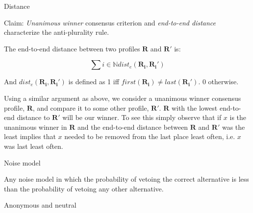 \documentclass[12pt]{article}
\newcommand{\N}{\mathbb{N}}
\newenvironment{question}[2][Question]{\begin{trivlist}
\item[\hskip \labelsep {\bfseries #1}\hskip \labelsep {\bfseries #2.}]}{\end{trivlist}}
\newenvironment{answer}[2][Answer]{\begin{trivlist}
\item[\hskip \labelsep {\bfseries #1}\hskip \labelsep {\bfseries #2:}]}{\end{trivlist}}
\begin{document}
\begin{answer}{b)}{Distance}

Claim: \textit{Unanimous winner} consensus criterion and \textit{end-to-end distance} characterize the anti-plurality rule.


The end-to-end distance between two profiles $\boldsymbol{R}$ and $\boldsymbol{R'}$ is:

$$\sum{i \in \N}{}{dist_e(\boldsymbol{R_i}, \boldsymbol{R_i'})}$$

And $dist_e(\boldsymbol{R_i}, \boldsymbol{R_i'})$ is defined as 1 iff $first(\boldsymbol{R_i}) \neq last(\boldsymbol{R_i'})$. 0 otherwise.

Using a similar argument as above, we consider a unanimous winner consensus profile, $\boldsymbol{R}$, and compare it to some other profile, $\boldsymbol{R'}$. $\boldsymbol{R}$ with the lowest end-to-end distance to $\boldsymbol{R'}$ will be our winner. To see this simply observe that if $x$ is the unanimous winner in $\boldsymbol{R}$ and the end-to-end distance between $\boldsymbol{R}$ and $\boldsymbol{R'}$ was the least implies that $x$ needed to be removed from the last place least often, i.e. $x$ was last least often.

\end{answer}

\begin{answer}{c)}{Noise model}

Any noise model in which the probability of vetoing the correct alternative is less than the probability of vetoing any other alternative.

\end{answer}

\begin{question}{2}{Anonymous and neutral}

\end{question}
\end{document}

